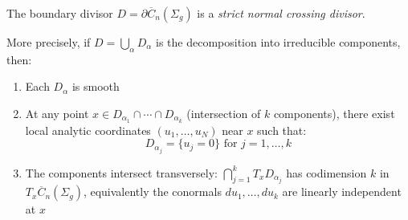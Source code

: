 \begin{theorem}\label{thm:normal-crossings}
The boundary divisor $D = \partial\overline{C}_n(\Sigma_g)$ is a \emph{strict normal crossing divisor}. 

More precisely, if $D = \bigcup_{\alpha} D_\alpha$ is the decomposition into irreducible components, then:
\begin{enumerate}
\item Each $D_\alpha$ is smooth
\item At any point $x \in D_{\alpha_1} \cap \cdots \cap D_{\alpha_k}$ (intersection of $k$ components), there exist local analytic coordinates $(u_1, \ldots, u_N)$ near $x$ such that:
\[D_{\alpha_j} = \{u_j = 0\} \text{ for } j = 1,\ldots,k\]
\item The components intersect transversely: $\bigcap_{j=1}^k T_x D_{\alpha_j}$ has codimension $k$ in $T_x \overline{C}_n(\Sigma_g)$, equivalently the conormals $du_1, \ldots, du_k$ are linearly independent at $x$
\end{enumerate}
\end{theorem}

